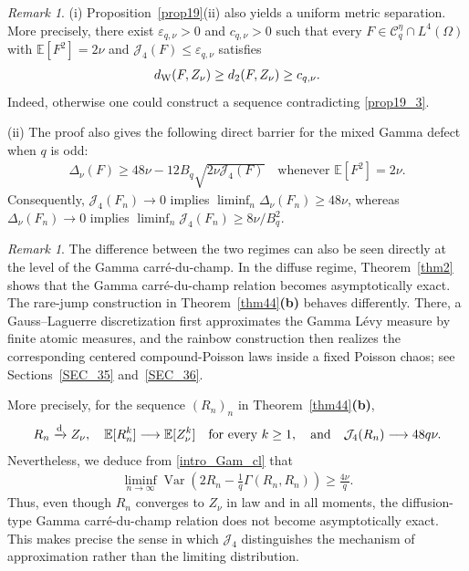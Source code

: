 \documentclass[letterpaper,11pt,reqno]{amsart}
\numberwithin{equation}{section}
\theoremstyle{plain}
\theoremstyle{definition}
\theoremstyle{remark}
\newtheorem{remark}[theorem]{Remark}
\newcommand{\E}{\mathbb{E}}
\newcommand{\cC}{\mathcal{C}}
\DeclareMathOperator{\Var}{Var}
\newcommand{\eps}{\varepsilon}
\newcommand{\noi}{\noindent}
\newcommand{\Jfour}{\mathcal J_4}
\newcommand{\dW}{d_{\rm W}}
\newcommand{\Del}{\Delta}
\newcommand{\Gam}{\Gamma}
\newcommand{\AND}{\quad{\rm and}\quad}
\begin{document}
\begin{remark}\rm
(i) Proposition~\ref{prop19}{\rm(ii)} also yields a uniform metric
separation.  More precisely, there exist
$\eps_{q,\nu}>0$ and $c_{q,\nu}>0$ such that every
$F\in\cC_q^\eta\cap L^4(\Omega)$ with $\E[F^2]=2\nu$ and
$\Jfour(F)\leq\eps_{q,\nu}$ satisfies
\noi
\begin{align*}
 \dW(F,Z_\nu)\geq d_2(F,Z_\nu)\geq c_{q,\nu}.
\end{align*}
Indeed, otherwise one could construct a sequence contradicting
\eqref{prop19_3}.

(ii) The proof also gives the following direct barrier for the mixed
Gamma defect when $q$ is odd:
\noi
\begin{align*}
 \Del_\nu(F)\geq48\nu-12B_q\sqrt{2\nu\Jfour(F)}
 \quad\text{whenever }\E[F^2]=2\nu.
\end{align*}
Consequently, $\Jfour(F_n)\to0$ implies
$\liminf_n\Del_\nu(F_n)\geq48\nu$, whereas
$\Del_\nu(F_n)\to0$ implies
$\liminf_n\Jfour(F_n)\geq8\nu/B_q^2$.
\end{remark}

\begin{remark}\rm
The difference between the two regimes can also be seen directly at
the level of the Gamma carr\'e-du-champ.  In the diffuse regime,
Theorem~\ref{thm2} shows that the Gamma carr\'e-du-champ relation
becomes asymptotically exact.  The rare-jump construction in
Theorem~\ref{thm44}{\bf(b)} behaves differently.  There, a
Gauss--Laguerre discretization first approximates the Gamma L\'evy
measure by finite atomic measures, and the rainbow construction then
realizes the corresponding centered compound-Poisson laws inside a
fixed Poisson chaos; see Sections~\ref{SEC_35} and~\ref{SEC_36}.

More precisely, for the sequence $(R_n)_n$ in
Theorem~\ref{thm44}{\bf(b)},
\noi
\begin{align*}
 R_n\xrightarrow{\mathrm d}Z_\nu,
 \quad
 \E[R_n^k]\longrightarrow\E[Z_\nu^k]
 \quad\text{for every }k\geq1,
 \AND
 \Jfour(R_n)\longrightarrow48q\nu.
\end{align*}
Nevertheless, we deduce from \eqref{intro_Gam_cl} that
\noi
\begin{align*}
 \liminf_{n\to\infty}
 \Var\left(2R_n-\frac1q\Gam(R_n,R_n)\right)
 \geq\frac{4\nu}{q}.
\end{align*}
Thus, even though $R_n$ converges to $Z_\nu$ in law and in all
moments, the diffusion-type Gamma carr\'e-du-champ relation does not
become asymptotically exact.  This makes precise the sense in which
$\Jfour$ distinguishes the mechanism of approximation rather than
the limiting distribution.
\end{remark}
\end{document}
